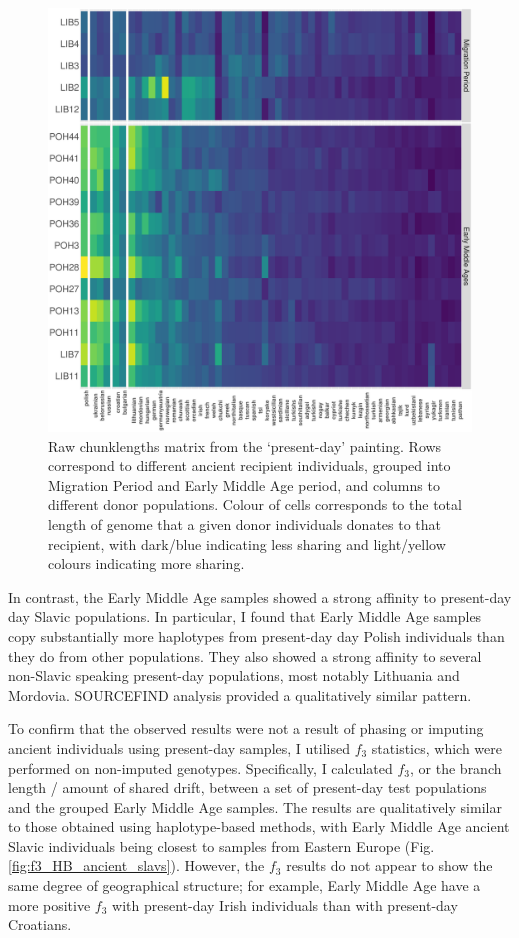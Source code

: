 \begin{figure}[htp]
    \centering
    \includegraphics[width=1.0\textwidth]{../images/chapter5/copymatrix_moderns_ancient_slavs.pdf}
    \caption{Raw chunklengths matrix from the `present-day' painting. Rows correspond to different ancient recipient individuals, grouped into Migration Period and Early Middle Age period, and columns to different donor populations. Colour of cells corresponds to the total length of genome that a given donor individuals donates to that recipient, with dark/blue  indicating less sharing and light/yellow colours indicating more sharing.}
    \label{fig:copymatrix_moderns_ancient_slavs}
\end{figure} 

In contrast, the Early Middle Age samples showed a strong affinity to present-day day Slavic populations. In particular, I found that Early Middle Age samples copy substantially more haplotypes from present-day day Polish individuals than they do from other populations. They also showed a strong affinity to several non-Slavic speaking present-day populations, most notably Lithuania and Mordovia. SOURCEFIND analysis provided a qualitatively similar pattern.

To confirm that the observed results were not a result of phasing or imputing ancient individuals using present-day samples, I utilised $f_{3}$ statistics, which were performed on non-imputed genotypes. Specifically, I calculated $f_{3}$, or the branch length / amount of shared drift, between a set of present-day test populations and the grouped Early Middle Age samples. The results are qualitatively similar to those obtained using haplotype-based methods, with Early Middle Age ancient Slavic individuals being closest to samples from Eastern Europe (Fig. \ref{fig:f3_HB_ancient_slavs}). However, the $f_{3}$ results do not appear to show the same degree of geographical structure; for example, Early Middle Age have a more positive $f_{3}$ with present-day Irish individuals than with present-day Croatians.

